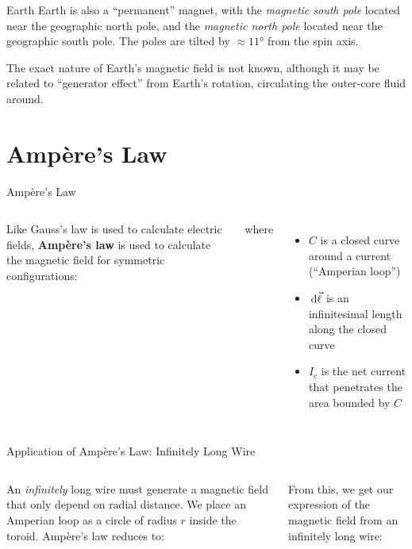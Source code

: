 \documentclass[12pt,aspectratio=169]{beamer}
\begin{document}
    
\begin{frame}{Earth}
  Earth is also a ``permanent'' magnet, with the \emph{magnetic south pole}
  located near the geographic north pole, and the \emph{magnetic north pole}
  located near the geographic south pole. The poles are tilted by
  $\approx\ang{11}$ from the spin axis.
  \begin{center}
  \end{center}
  The exact nature of Earth's magnetic field is not known, although it may be
  related to ``generator effect'' from Earth's rotation, circulating the
  outer-core fluid around.
\end{frame}



\section{Amp\`{e}re's Law}

\begin{frame}{Amp\`{e}re's Law}
  \begin{columns}
    
    Like Gauss's law is used to calculate electric fields,
    \textbf{Amp\`{e}re's law} is used to calculate the magnetic field for
    symmetric configurations:

    where
    \begin{itemize}
    \item $C$ is a closed curve around a current (``Amperian loop'')
    \item $\dl{\vec\ell}$ is an infinitesimal length along the closed curve
    \item $I_c$ is the net current that penetrates the area bounded by $C$
    \end{itemize}
  \end{columns}
\end{frame}



\begin{frame}{Application of Amp\`{e}re's Law: Infinitely Long Wire}
  \begin{columns}

    An \emph{infinitely} long wire must generate a magnetic field that only
    depend on radial distance. We place an Amperian loop as a circle of radius
    $r$ inside the toroid. Amp\`{e}re's law reduces to:

      
    From this, we get our expression of the magnetic field from an infinitely
    long wire:
      
  \end{columns}
\end{frame}
\end{document}
